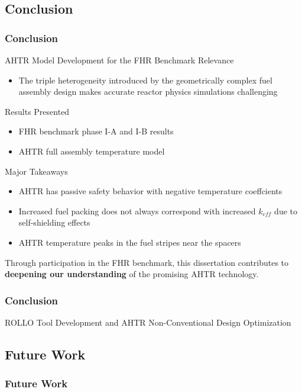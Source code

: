 \subsection{Conclusion}
\begin{frame}
    \frametitle{Conclusion}
    \begin{block}{AHTR Model Development for the FHR Benchmark}
        Relevance
        \begin{itemize}
            \item The triple heterogeneity introduced by the geometrically complex 
            fuel assembly design makes accurate reactor physics simulations challenging
        \end{itemize}
        Results Presented 
        \begin{itemize}
            \item FHR benchmark phase I-A and I-B results
            \item AHTR full assembly temperature model 
        \end{itemize}
        Major Takeaways 
        \begin{itemize}
            \item AHTR has passive safety behavior with negative temperature coeffcients
            \item Increased fuel packing does not always correspond with increased 
            $k_{eff}$ due to self-shielding effects 
            \item AHTR temperature peaks in the fuel stripes near the spacers 
        \end{itemize}
    \end{block}
    
    Through participation in the \gls{FHR} benchmark, this dissertation contributes to 
    \textbf{deepening our understanding} of the promising \gls{AHTR} technology. 
\end{frame}

\begin{frame}
    \frametitle{Conclusion}
    ROLLO Tool Development and AHTR Non-Conventional Design Optimization
\end{frame}

\subsection{Future Work}
\begin{frame}
    \frametitle{Future Work}

\end{frame}